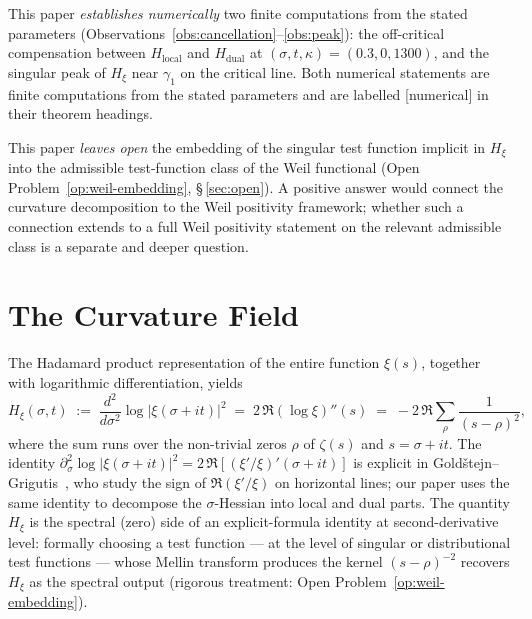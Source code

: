 \documentclass[11pt]{article}
\newcommand{\Hxi}{H_{\xi}}
\newcommand{\Hlocal}{H_{\mathrm{local}}}
\newcommand{\Hdual}{H_{\mathrm{dual}}}
\begin{document}
This paper \emph{establishes numerically} two finite
computations from the stated parameters
(Observations~\ref{obs:cancellation}--\ref{obs:peak}):
the off-critical compensation between $\Hlocal$ and $\Hdual$
at $(\sigma,t,\kappa)=(0.3,0,1300)$, and the singular peak of
$\Hxi$ near $\gamma_1$ on the critical line.
Both numerical statements are finite computations from the
stated parameters and are labelled [numerical] in their
theorem headings.

This paper \emph{leaves open} the embedding of the singular
test function implicit in $\Hxi$ into the admissible
test-function class of the Weil functional
(Open Problem~\ref{op:weil-embedding}, \S\,\ref{sec:open}).
A positive answer would connect the curvature decomposition
to the Weil positivity framework; whether such a connection
extends to a full Weil positivity statement on the relevant
admissible class is a separate and deeper question.

\section{The Curvature Field}
\label{sec:field}

The Hadamard product representation of the entire function
$\xi(s)$, together with logarithmic differentiation, yields
\begin{equation}\label{eq:Hxi}
\Hxi(\sigma,t)
\;:=\;\frac{d^2}{d\sigma^2}\log\lvert\xi(\sigma+it)\rvert^2
\;=\;2\,\Re(\log\xi)''(s)
\;=\;-2\,\Re\sum_{\rho}\frac{1}{(s-\rho)^2},
\end{equation}
where the sum runs over the non-trivial zeros $\rho$ of
$\zeta(s)$ and $s=\sigma+it$.
The identity
$\partial_\sigma^2\log\lvert\xi(\sigma+it)\rvert^2
=2\,\Re[(\xi'/\xi)'(\sigma+it)]$
is explicit in
Gold\v{s}tejn--Grigutis~\cite{GoldstejnGrigutis24},
who study the sign of $\Re(\xi'/\xi)$ on horizontal lines;
our paper uses the same identity to decompose the
$\sigma$-Hessian into local and dual parts.
The quantity $\Hxi$ is the spectral (zero) side of an
explicit-formula identity at second-derivative level: formally
choosing a test function --- at the level of singular or
distributional test functions --- whose Mellin transform
produces the kernel $(s-\rho)^{-2}$ recovers $\Hxi$ as the
spectral output (rigorous treatment:
Open Problem~\ref{op:weil-embedding}).
\end{document}
